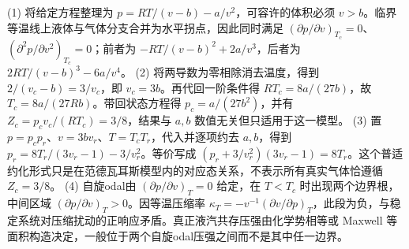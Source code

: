 (1) 将给定方程整理为 \(p=RT/(v-b)-a/v^2\)，可容许的体积必须 \(v>b\)。临界等温线上液体与气体分支合并为水平拐点，因此同时满足 \((\partial p/\partial v)_{T_c}=0\)、\((\partial^2p/\partial v^2)_{T_c}=0\)；前者为 \(-RT/(v-b)^2+2a/v^3\)，后者为 \(2RT/(v-b)^3-6a/v^4\)。
(2) 将两导数为零相除消去温度，得到 \(2/(v_c-b)=3/v_c\)，即 \(v_c=3b\)。再代回一阶条件得 \(RT_c=8a/(27b)\)，故 \(T_c=8a/(27Rb)\)。带回状态方程得 \(p_c=a/(27b^2)\)，并有 \(Z_c=p_cv_c/(RT_c)=3/8\)，结果与 \(a,b\) 数值无关但只适用于这一模型。
(3) 置 \(p=p_cp_r\)、\(v=3bv_r\)、\(T=T_cT_r\)，代入并逐项约去 \(a,b\)，得到 \(p_r=8T_r/(3v_r-1)-3/v_r^2\)。等价写成 \((p_r+3/v_r^2)(3v_r-1)=8T_r\)。这个普适约化形式只是在范德瓦耳斯模型内的对应态关系，不表示所有真实气体恰遵循 \(Z_c=3/8\)。
(4) 自旋odal由 \((\partial p/\partial v)_T=0\) 给定，在 \(T<T_c\) 时出现两个边界根，中间区域 \((\partial p/\partial v)_T>0\)。因等温压缩率 \(\kappa_T=-v^{-1}(\partial v/\partial p)_T\)，此段为负，与稳定系统对压缩扰动的正响应矛盾。真正液汽共存压强由化学势相等或 Maxwell 等面积构造决定，一般位于两个自旋odal压强之间而不是其中任一边界。
